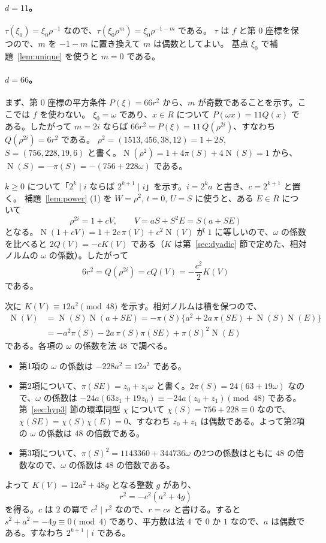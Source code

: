\documentclass[a4paper,11pt]{ltjsarticle}
\theoremstyle{jplain}
\numberwithin{equation}{section}
\numberwithin{table}{section}
\newcommand{\Nm}{\operatorname{N}}
\begin{document}
\paragraph{$d=11$。}
$\tau(\xi_0)=\xi_0\rho^{-1}$ なので、$\tau(\xi_0\rho^m)=\xi_0\rho^{-1-m}$ である。
$\tau$ は $f$ と第 $0$ 座標を保つので、$m$ を $-1-m$ に置き換えて $m$ は偶数としてよい。
基点 $\xi_0$ で補題~\ref{lem:unique} を使うと $m=0$ である。

\paragraph{$d=66$。}
まず、第 $0$ 座標の平方条件 $P(\xi)=66r^2$ から、$m$ が奇数であることを示す。ここでは $f$ を使わない。
$\xi_0=\omega$ であり、$x\in R$ について $P(\omega x)=11Q(x)$ である。したがって $m=2i$ ならば $66r^2=P(\xi)=11\,Q(\rho^{2i})$、すなわち $Q(\rho^{2i})=6r^2$ である。
$\rho^2=(1513,456,38,12)=1+2S$, $S=(756,228,19,6)$ と書く。$\Nm(\rho^2)=1+4\pi(S)+4\Nm(S)=1$ から、$\Nm(S)=-\pi(S)=-(756+228\omega)$ である。

$k\ge0$ について「$2^k\mid i$ ならば $2^{k+1}\mid i$」を示す。$i=2^ka$ と書き、$c=2^{k+1}$ と置く。
補題~\ref{lem:power} (1) を $W=\rho^2$, $t=0$, $U=S$ に使うと、ある $E\in R$ について
\[
\rho^{2i}=1+cV,\qquad V=aS+S^2E=S(a+SE)
\]
となる。$\Nm(1+cV)=1+2c\,\pi(V)+c^2\Nm(V)$ が $1$ に等しいので、$\omega$ の係数を比べると $2Q(V)=-cK(V)$ である（$K$ は第~\ref{sec:dyadic} 節で定めた、相対ノルムの $\omega$ の係数）。したがって
\[
6r^2=Q(\rho^{2i})=cQ(V)=-\frac{c^2}2K(V)
\]
である。

次に $K(V)\equiv12a^2\pmod{48}$ を示す。相対ノルムは積を保つので、
\[
\begin{aligned}
\Nm(V)&=\Nm(S)\Nm(a+SE)=-\pi(S)\bigl\{a^2+2a\,\pi(SE)+\Nm(S)\Nm(E)\bigr\}\\
&=-a^2\pi(S)-2a\,\pi(S)\pi(SE)+\pi(S)^2\Nm(E)
\end{aligned}
\]
である。各項の $\omega$ の係数を法 $48$ で調べる。
\begin{itemize}
\item 第1項の $\omega$ の係数は $-228a^2\equiv12a^2$ である。
\item 第2項について、$\pi(SE)=z_0+z_1\omega$ と書く。$2\pi(S)=24(63+19\omega)$ なので、$\omega$ の係数は $-24a(63z_1+19z_0)\equiv-24a(z_0+z_1)\pmod{48}$ である。第~\ref{sec:hyp3} 節の環準同型 $\chi$ について $\chi(S)=756+228\equiv0$ なので、$\chi(SE)=\chi(S)\chi(E)=0$、すなわち $z_0+z_1$ は偶数である。よって第2項の $\omega$ の係数は $48$ の倍数である。
\item 第3項について、$\pi(S)^2=1143360+344736\omega$ の2つの係数はともに $48$ の倍数なので、$\omega$ の係数は $48$ の倍数である。
\end{itemize}
よって $K(V)=12a^2+48g$ となる整数 $g$ があり、
\[
r^2=-c^2(a^2+4g)
\]
を得る。$c$ は $2$ の冪で $c^2\mid r^2$ なので、$r=cs$ と書ける。すると $s^2+a^2=-4g\equiv0\pmod4$ であり、平方数は法 $4$ で $0$ か $1$ なので、$a$ は偶数である。すなわち $2^{k+1}\mid i$ である。
\end{document}
